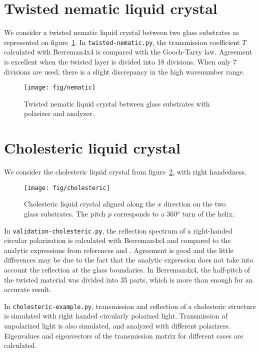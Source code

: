 \section{Twisted nematic liquid crystal}
We consider a twisted nematic liquid crystal between two glass substrates as represented on figure~\ref{fig:nematic}.  
In \verb/twisted-nematic.py/, the transmission coefficient $T$ calculated with Berreman4x4 is compared with the Gooch-Tarry law.
Agreement is excellent when the twisted layer is divided into 18 divisions.
When only 7 divisions are used, there is a slight discrepancy in the high wavenumber range.

\begin{figure}[!h]
\begin{center}
\texttt{[image: fig/nematic]}
\caption{\label{fig:nematic} Twisted nematic liquid crystal between glass substrates with polarizer and analyzer.}
\end{center}
\end{figure}

\section{Cholesteric liquid crystal}
We consider the cholesteric liquid crystal from figure~\ref{fig:cholesteric}, with right handedness.

\begin{figure}[!h]
\begin{center}
\texttt{[image: fig/cholesteric]}
\end{center}
\caption{\label{fig:cholesteric}Cholesteric liquid crystal aligned along the $x$ direction on the two glass substrates. The pitch $p$ corresponds to a 360° turn of the helix.}
\end{figure}

In \verb/validation-cholesteric.py/, the reflection spectrum of a right-handed circular polarization is calculated with Berreman4x4 and compared to the analytic expressions from references  and .
Agreement is good and the little differences may be due to the fact that the analytic expression does not take into account the reflection at the glass boundaries.
In Berreman4x4, the half-pitch of the twisted material was divided into 35 parts, which is more than enough for an accurate result.

In \verb/cholesteric-example.py/, transmission and reflection of a cholesteric structure is simulated with right handed circularly polarized light.
Transmission of unpolarized light is also simulated, and analyzed with different polarizers.
Eigenvalues and eigenvectors of the transmission matrix for different cases are calculated.


